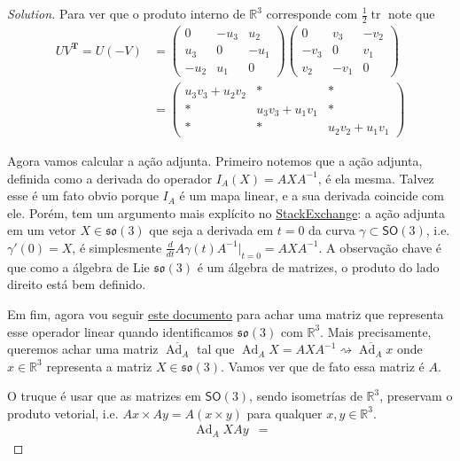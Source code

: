 \begin{proof}[Solution]
Para ver que o produto interno de $\mathbb{R}^{3}$ corresponde com $\frac{1}{2}\operatorname{tr}$ note que
\begin{align*}
	UV^{\mathbf{T}}=U(-V)&=\begin{pmatrix} 0&-u_3&u_2\\u_3&0&-u_1\\-u_2&u_1&0 \end{pmatrix} \begin{pmatrix} 0&v_3&-v_2\\-v_3&0&v_1\\v_2&-v_1&0 \end{pmatrix} \\
		       &=\begin{pmatrix} u_3v_3+u_2v_2&*&*\\ *&u_3v_3+u_1v_1&*\\ *&*&u_2v_2+u_1v_1 \end{pmatrix} 
\end{align*}

\item Agora vamos calcular a ação adjunta. 
Primeiro notemos que a ação adjunta, definida como a derivada do operador $I_A(X)=AXA^{-1}$, é ela mesma. Talvez esse é um fato obvio porque $I_A$  é um mapa linear, e a sua derivada coincide com ele. Porém, tem um argumento mais explícito no \href{https://math.stackexchange.com/questions/512026/prove-that-the-action-of-a-lie-group-on-its-lie-algebra-via-the-adjoint-represen}{StackExchange}: a ação adjunta em um vetor  $X\in\mathfrak{so}(3)$ que seja a derivada em $t=0$ da curva $\gamma\subset \mathsf{SO}(3)$, i.e.  $\gamma'(0)=X$, é simplesmente $\frac{d}{dt}A\gamma(t)A^{-1}\Big|_{t=0}=AXA^{-1}$. A observação chave é que como a álgebra de Lie $\mathfrak{so}(3)$ é um álgebra de matrizes, o produto do lado direito está bem definido.

Em fim, agora vou seguir \href{https://www.ethaneade.org/lie.pdf}{este documento} para achar uma matriz que representa esse operador linear quando identificamos $\mathfrak{so}(3)$ com $\mathbb{R}^{3}$. Mais precisamente, queremos achar uma matriz  $\overline{\operatorname{Ad}_A}$ tal que $\operatorname{Ad}_AX=AXA^{-1}\rightsquigarrow \overline{\operatorname{Ad}_A}x$ onde $x\in\mathbb{R}^{3}$  representa a matriz $X\in\mathfrak{so}(3)$. Vamos ver que de fato essa matriz é $A$.

O truque é usar que as matrizes em $\mathsf{SO}(3)$, sendo isometrías de $\mathbb{R}^{3}$, preservam o produto vetorial, i.e. $Ax\times Ay=A(x \times y)$ para qualquer $x,y\in\mathbb{R}^{3}$.
\begin{align*}
	\operatorname{Ad}_AXAy&=
\end{align*}
\end{proof}

